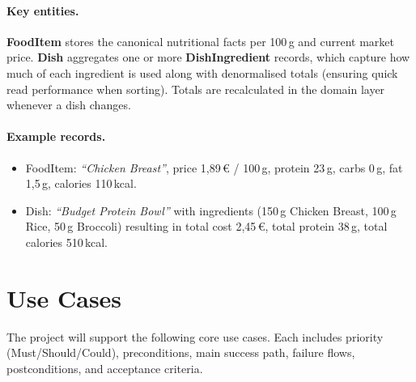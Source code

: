 \documentclass[11pt]{article}
\begin{document}
\paragraph{Key entities.} \textbf{FoodItem} stores the canonical nutritional facts per 100\,g and current market price. \textbf{Dish} aggregates one or more \textbf{DishIngredient} records, which capture how much of each ingredient is used along with denormalised totals (ensuring quick read performance when sorting). Totals are recalculated in the domain layer whenever a dish changes.

\paragraph{Example records.}
\begin{itemize}[noitemsep]
  \item FoodItem: \emph{``Chicken Breast''}, price 1{,}89\,€ / 100\,g, protein 23\,g, carbs 0\,g, fat 1{,}5\,g, calories 110\,kcal.
  \item Dish: \emph{``Budget Protein Bowl''} with ingredients (150\,g Chicken Breast, 100\,g Rice, 50\,g Broccoli) resulting in total cost 2{,}45\,€, total protein 38\,g, total calories 510\,kcal.
\end{itemize}

\section{Use Cases}

The project will support the following core use cases. Each includes priority (Must/Should/Could), preconditions, main success path, failure flows, postconditions, and acceptance criteria.
\end{document}
